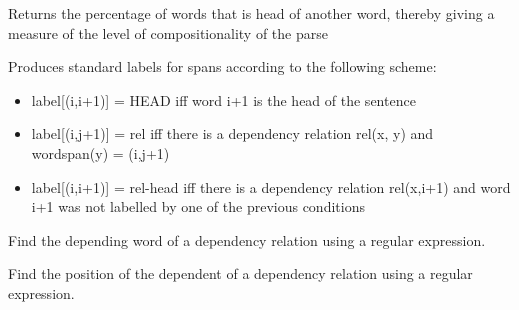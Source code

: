 \documentclass[letterpaper,10pt,english]{sphinxmanual}
\begin{document}
\begin{fulllineitems}
\begin{fulllineitems}
\end{fulllineitems}


\begin{fulllineitems}
\label{dependencies:dependencies.Dependencies.comp_score}
Returns the percentage of words that is head
of another word, thereby giving a measure of
the level of compositionality of the parse

\end{fulllineitems}


\begin{fulllineitems}
\label{dependencies:dependencies.Dependencies.dependency_labels}
Produces standard labels for spans according to the following scheme:
\begin{itemize}
\item {} 
label{[}(i,i+1){]} = HEAD         iff word i+1 is the head of the sentence

\item {} 
label{[}(i,j+1){]} = rel          iff there is a dependency relation rel(x, y) and wordspan(y) = (i,j+1)

\item {} 
label{[}(i,i+1){]} = rel-head iff there is a dependency relation rel(x,i+1) and word i+1 was not labelled by one of the previous conditions

\end{itemize}

\end{fulllineitems}


\begin{fulllineitems}
\label{dependencies:dependencies.Dependencies.find_dependent}
Find the depending word of a dependency relation using a regular
expression.

\end{fulllineitems}


\begin{fulllineitems}
\label{dependencies:dependencies.Dependencies.find_dependent_pos}
Find the position of the dependent of a dependency relation
using a regular expression.


\end{fulllineitems}
\end{fulllineitems}
\end{document}
